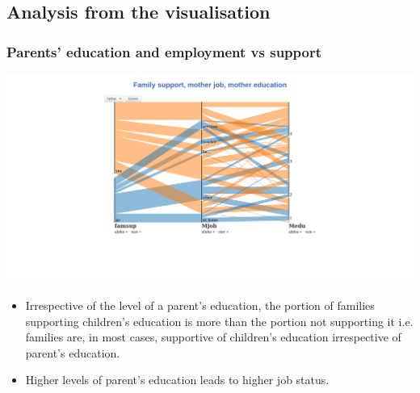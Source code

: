 \documentclass[titlepage, 12pt]{article}
\begin{document}
\subsection{Analysis from the visualisation}
 
\subsubsection{Parents' education and employment vs support}

\begin{center}
\includegraphics[scale=0.2]{1}
\end{center}
\begin{itemize}
    \item Irrespective of the level of a parent’s education, the portion of families supporting children’s education is more than the portion not supporting it i.e. families are, in most cases, supportive of children’s education irrespective of parent’s education.
    \item Higher levels of parent’s education leads to higher job status.
\end{itemize}
\end{document}
